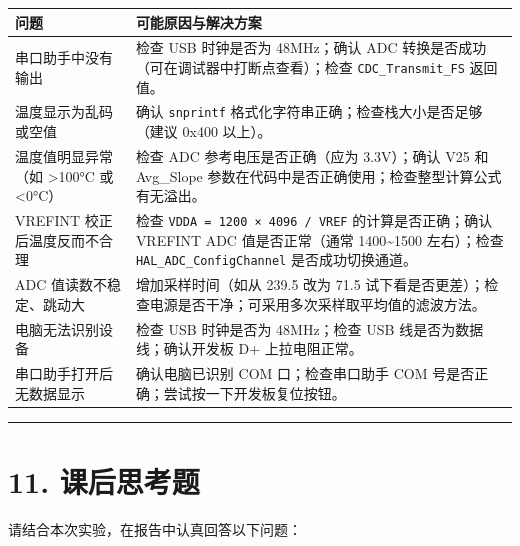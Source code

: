 \documentclass[
  chinese,
  UTF8,
  oneside,
  openany]{ctexbook}
\begin{document}
\begin{longtable}[]{@{}
  >{\raggedright\arraybackslash}p{}
  >{\raggedright\arraybackslash}p{}@{}}
\toprule\noalign{}
\begin{minipage}[b]{\linewidth}\raggedright
问题
\end{minipage} & \begin{minipage}[b]{\linewidth}\raggedright
可能原因与解决方案
\end{minipage} \\
\midrule\noalign{}
\endhead
\bottomrule\noalign{}
\endlastfoot
串口助手中没有输出 & 检查 USB 时钟是否为 48MHz；确认 ADC
转换是否成功（可在调试器中打断点查看）；检查 \texttt{CDC\_Transmit\_FS}
返回值。 \\
温度显示为乱码或空值 & 确认 \texttt{snprintf}
格式化字符串正确；检查栈大小是否足够（建议 0x400 以上）。 \\
温度值明显异常（如 \textgreater100°C 或 \textless0°C） & 检查 ADC
参考电压是否正确（应为 3.3V）；确认 V25 和 Avg\_Slope
参数在代码中是否正确使用；检查整型计算公式有无溢出。 \\
VREFINT 校正后温度反而不合理 & 检查
\texttt{VDDA\ =\ 1200\ ×\ 4096\ /\ VREF} 的计算是否正确；确认 VREFINT
ADC 值是否正常（通常 1400\textasciitilde1500 左右）；检查
\texttt{HAL\_ADC\_ConfigChannel} 是否成功切换通道。 \\
ADC 值读数不稳定、跳动大 & 增加采样时间（如从 239.5 改为 71.5
试下看是否更差）；检查电源是否干净；可采用多次采样取平均值的滤波方法。 \\
电脑无法识别设备 & 检查 USB 时钟是否为 48MHz；检查 USB
线是否为数据线；确认开发板 D+ 上拉电阻正常。 \\
串口助手打开后无数据显示 & 确认电脑已识别 COM 口；检查串口助手 COM
号是否正确；尝试按一下开发板复位按钮。 \\
\end{longtable}

\begin{center}\rule{0.5\linewidth}{0.5pt}\end{center}

\section{11. 课后思考题}\label{ux8bfeux540eux601dux8003ux9898-1}

请结合本次实验，在报告中认真回答以下问题：
\end{document}
